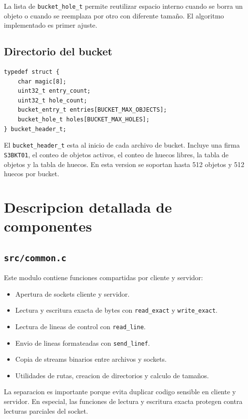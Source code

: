 \documentclass[12pt,letterpaper]{article}
\begin{document}
La lista de \texttt{bucket\_hole\_t} permite reutilizar espacio interno cuando se
borra un objeto o cuando se reemplaza por otro con diferente tama\~{n}o. El algoritmo
implementado es primer ajuste.

\subsection{Directorio del bucket}

\begin{lstlisting}[style=cstyle]
typedef struct {
    char magic[8];
    uint32_t entry_count;
    uint32_t hole_count;
    bucket_entry_t entries[BUCKET_MAX_OBJECTS];
    bucket_hole_t holes[BUCKET_MAX_HOLES];
} bucket_header_t;
\end{lstlisting}

El \texttt{bucket\_header\_t} esta al inicio de cada archivo de bucket. Incluye una
firma \texttt{S3BKT01}, el conteo de objetos activos, el conteo de huecos libres, la
tabla de objetos y la tabla de huecos. En esta version se soportan hasta 512 objetos
y 512 huecos por bucket.

\section{Descripcion detallada de componentes}

\subsection{\texttt{src/common.c}}

Este modulo contiene funciones compartidas por cliente y servidor:
\begin{itemize}
    \item Apertura de sockets cliente y servidor.
    \item Lectura y escritura exacta de bytes con \texttt{read\_exact} y
    \texttt{write\_exact}.
    \item Lectura de lineas de control con \texttt{read\_line}.
    \item Envio de lineas formateadas con \texttt{send\_linef}.
    \item Copia de streams binarios entre archivos y sockets.
    \item Utilidades de rutas, creacion de directorios y calculo de tama\~{n}os.
\end{itemize}

La separacion es importante porque evita duplicar codigo sensible en cliente y
servidor. En especial, las funciones de lectura y escritura exacta protegen contra
lecturas parciales del socket.
\end{document}
